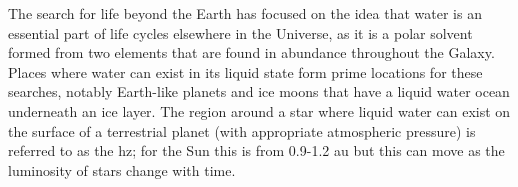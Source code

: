 \documentclass[letterpaper]{ar-1col}
\begin{document}
\begin{figure}[ht]
{%
}
  \label{fig:nstars}
\end{figure}





The search for life beyond the Earth has focused on the idea that water is an essential part of life cycles elsewhere in the Universe, as it is a polar solvent formed from two elements that are found in abundance throughout the Galaxy.
%
Places where water can exist in its liquid state form prime locations for these searches, notably Earth-like planets and ice moons that have a liquid water ocean underneath an ice layer.
%
The region around a star where liquid water can exist on the surface of a terrestrial planet (with appropriate atmospheric pressure) is referred to as the \ac{hz}; for the Sun this is from 0.9-1.2 au but this can move as the luminosity of stars change with time.
\end{document}
